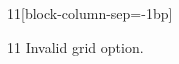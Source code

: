 \documentclass[paper=A4]{ropas-poster}
\begin{document}
\begin{postergrid}{1}{1}[block-column-sep=-1bp]
\begin{posterblock}{1}{1}
Invalid grid option.
\end{posterblock}
\end{postergrid}
\end{document}
